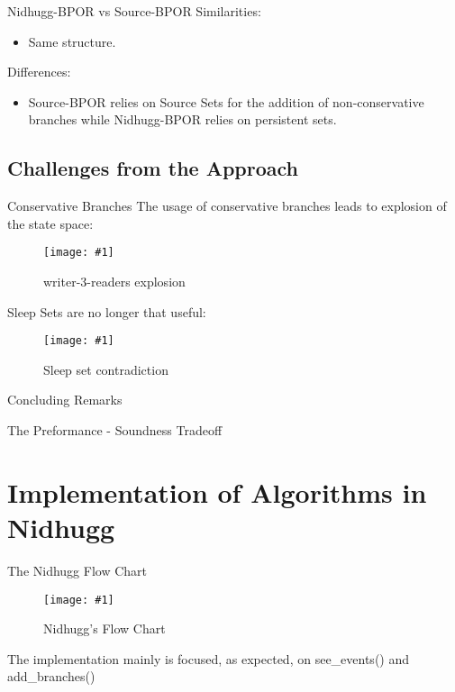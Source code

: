 \documentclass[9pt]{beamer}
\newcommand{\trace}[2]{
\begin{figure}[H]
\centering
\texttt{[image: \#1]}
\caption{#2}
\label{#2}
\end{figure}
}
\newcommand{\mediumGraph}[2]{
  \begin{figure}[H]
    \centering
    \texttt{[image: \#1]}
    \caption{#2}
    \label{#2}
    \end{figure}
    }
\begin{document}
\begin{frame}{Nidhugg-BPOR vs Source-BPOR}
Similarities:
\begin{itemize}
\item Same structure. 
\end{itemize}

Differences:
\begin{itemize}
    \item Source-BPOR relies on Source Sets for the addition of non-conservative branches while Nidhugg-BPOR relies on persistent sets.
\end{itemize}

    
\end{frame}

\subsection{Challenges from the Approach}

\begin{frame}{Conservative Branches}
The usage of conservative branches leads to explosion of the state space:
    
\trace{../img/w3rbpor.pdf}{writer-3-readers explosion}

\end{frame}


\begin{frame}
Sleep Sets are no longer that useful:
    
\trace{../img/sleepsetproblem.pdf}{Sleep set contradiction}

\end{frame}


\begin{frame}{Concluding Remarks}
    
The Preformance - Soundness Tradeoff

\end{frame}

\section{Implementation of Algorithms in Nidhugg}

\begin{frame}{The Nidhugg Flow Chart}
    
\mediumGraph{../img/flowchartv2.pdf}{Nidhugg's Flow Chart}

\end{frame}

\begin{frame}
The implementation mainly is focused, as expected,  on see\_events() and add\_branches()
\end{frame}
\end{document}
